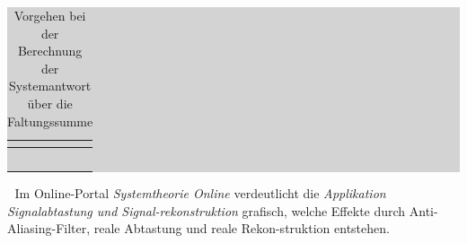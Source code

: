 \begin{table}[H]
\setlength{\arrayrulewidth}{.1em}
\caption{Vorgehen bei der Berechnung der Systemantwort über die Faltungssumme}
\setlength{\fboxsep}{0pt}%
\colorbox{lightgray}{%
%
\begin{tabular}{| c | c |}
\hline
\parbox[c][0.35in][c]{0.5in}{\smallskip\centering\textbf{\selectfont{Schritt}}} & \parbox[c][0.35in][c]{6in}{\smallskip\centering\textbf{\selectfont{Beschreibung}}}\\ \hline

\parbox[c][0.4in][c]{0.5in}{} & 
\parbox[c][0.4in][c]{6in}{}\\ \hline

\parbox[c][0.4in][c]{0.5in}{} & \parbox[c][0.4in][c]{6in}{}\\ \hline

\parbox[c][0.4in][c]{0.5in}{} & 
\parbox[c][0.4in][c]{6in}{}\\ \hline

\parbox[c][0.6in][c]{0.5in}{} & 
\parbox[c][0.6in][c]{6in}{}\\ \hline

\parbox[c][0.4in][c]{0.5in}{} & 
\parbox[c][0.4in][c]{6in}{}\\ \hline

\end{tabular}%
}
\label{tab:fourfive}
\end{table}

\textcolor{white}{.}\newline
\noindent Im Online-Portal \textit{Systemtheorie Online} verdeutlicht die \textit{Applikation Signalabtastung und Signal-rekonstruktion} grafisch, welche Effekte durch Anti-Aliasing-Filter, reale Abtastung und reale Rekon-struktion entstehen.\newline   

